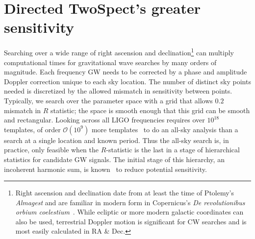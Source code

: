 

\section{Directed TwoSpect's greater sensitivity}

Searching over a wide range of right ascension and declination\footnote{Right ascension and declination date from at least the time of Ptolemy's \textit{Almagest} and are familiar in modern form in Copernicus's \textit{De revolutionibus orbium coelestium}~\cite{Hawking2002}. While ecliptic or more modern galactic coordinates can also be used, terrestrial Doppler motion is significant for CW searches and is most easily calculated in RA \& Dec.} can multiply computational times for gravitational wave searches by many orders of magnitude.
Each frequency GW needs to be corrected by a phase and amplitude Doppler correction unique to each sky location.
The number of distinct sky points needed is discretized by the allowed mismatch in sensitivity between points.
Typically, we search over the parameter space with a grid that allows $0.2$ mismatch in $R$ statistic; the space is smooth enough that this grid can be smooth and rectangular.
Looking across all LIGO frequencies requires over $10^{18}$ templates, of order $\mathcal{O}(10^9)$ more templates~\cite{GoetzTwoSpectMethods2011} to do an all-sky analysis than a search at a single location and known period.
Thus the all-sky search is, in practice, only feasible when the $R$-statistic is the last in a stage of hierarchical statistics for candidate GW signals.
The initial stage of this hierarchy, an incoherent harmonic sum, is known~\cite{GoetzTwoSpectMethods2011} to reduce potential sensitivity.

